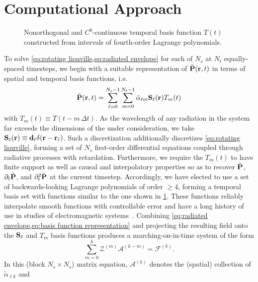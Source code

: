 \section{Computational Approach}

\begin{figure}
  
  \caption{\label{fig:interpolation basis} Nonorthogonal and $C^0$-continuous temporal basis function $T(t)$ constructed from intervals of fourth-order Lagrange polynomials.}
\end{figure}
To solve \cref{eq:rotating liouville,eq:radiated envelope} for each of $N_s$ \qds{} at $N_t$ equally-spaced timesteps, we begin with a suitable representation of $\tilde{\vb{P}}(\vb{r}, t)$ in terms of spatial and temporal basis functions, i.e.~
\begin{equation}
  \tilde{\vb{P}}(\vb{r}, t) = \sum_{\ell=0}^{N_s - 1} \sum_{m = 0}^{N_t - 1} \tilde{\alpha}_{\ell m} \vb{S}_\ell(\vb{r}) T_m(t)
  \label{eq:basis function representation}
\end{equation}
with $T_m(t) \equiv T(t - m \, \Delta t)$.
As the wavelength of any radiation in the system far exceeds the dimensions of the \qds{} under consideration, we take $\vb{S}_\ell(\vb{r}) \equiv \vb{d}_\ell \delta(\vb{r} - \vb{r}_\ell)$.
Such a discretization additionally discretizes \cref{eq:rotating liouville}, forming a set of $N_s$ first-order differential equations coupled through radiative processes with retardation.
Furthermore, we require the $T_m(t)$ to have finite support as well as causal and interpolatory properties so as to recover $\tilde{\vb{P}}$, $\partial_t \tilde{\vb{P}}$, and $\partial^2_t \tilde{\vb{P}}$ at the current timestep.
Accordingly, we have elected to use a set of backwards-looking Lagrange polynomials of order $\ge 4$, forming a temporal basis set with functions similar to the one shown in \cref{fig:interpolation basis}.
These functions  reliably interpolate smooth functions with controllable error and have a long history of use in studies of electromagnetic systems~\cite{SHANKER,SHANKER,SHANKER}.
Combining \cref{eq:radiated envelope,eq:basis function representation} and projecting the resulting field onto the $\vb{S}_\ell$ and $T_m$ basis functions produces a marching-on-in-time system of the form
\begin{equation}
  \sum_{m = 0}^{k} \mathcal{Z}^{(m)} \mathcal{A}^{(k - m)} = \mathcal{F}^{(k)}.
  \label{eq:zmatrix}
\end{equation}
In this (block $N_s \times N_s$) matrix equation, $\mathcal{A}^{(k)}$ denotes the (spatial) collection of $\tilde{\alpha}_{\ell k}$ and
